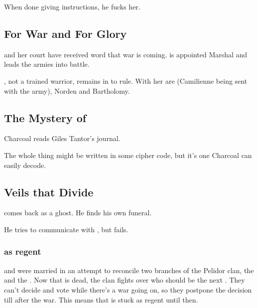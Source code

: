 When done giving instructions, he fucks her. 









\subsection{For War and For Glory}
\Tiroco{} and her court have received word that war is coming. 
 is appointed Marshal and leads the armies into battle. 

\Tiroco{}, not a trained warrior, remains in \Malcur to rule. 
With her are \Vincerre{} (Camilienne being sent with the army), Norden and Bartholomy. 









\subsection{The Mystery of \EreshKal}
Charcoal reads Giles Tantor's journal. 

The whole thing might be written in some cipher code, but it's one Charcoal can easily decode. 







\subsection{Veils that Divide} 
\Icor{} comes back as a ghost. 
He finds his own funeral. 

He tries to communicate with \Tiroco, but fails.





\subsubsection{\Tiroco{} as regent}
\Tiroco{} and \Icor{} were married in an attempt to reconcile two branches of the Pelidor clan, the \Malcurians{} and the \Forcliners. 
Now that \Icor{} is dead, the clan fights over who should be the next \rayuth. 
They can't decide and vote while there's a war going on, so they postpone the decision till after the war. 
This means that \Tiroco{} is stuck as regent until then. 

